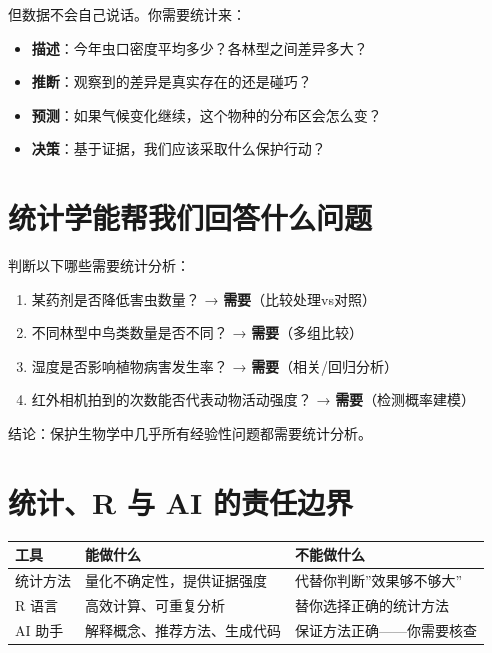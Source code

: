 \documentclass[
  letterpaper,
]{scrbook}
\newcounter{none} %
\providecommand{\tightlist}{%
  \setlength{\itemsep}{0pt}\setlength{\parskip}{0pt}}
\begin{document}
但数据不会自己说话。你需要统计来：

\begin{itemize}
\tightlist
\item
  \textbf{描述}：今年虫口密度平均多少？各林型之间差异多大？
\item
  \textbf{推断}：观察到的差异是真实存在的还是碰巧？
\item
  \textbf{预测}：如果气候变化继续，这个物种的分布区会怎么变？
\item
  \textbf{决策}：基于证据，我们应该采取什么保护行动？
\end{itemize}

\section{统计学能帮我们回答什么问题}\label{ux7edfux8ba1ux5b66ux80fdux5e2eux6211ux4eecux56deux7b54ux4ec0ux4e48ux95eeux9898}

判断以下哪些需要统计分析：

\begin{enumerate}
\def\labelenumi{\arabic{enumi}.}
\tightlist
\item
  某药剂是否降低害虫数量？ → \textbf{需要}（比较处理vs对照）
\item
  不同林型中鸟类数量是否不同？ → \textbf{需要}（多组比较）
\item
  湿度是否影响植物病害发生率？ → \textbf{需要}（相关/回归分析）
\item
  红外相机拍到的次数能否代表动物活动强度？ →
  \textbf{需要}（检测概率建模）
\end{enumerate}

结论：保护生物学中几乎所有经验性问题都需要统计分析。

\section{统计、R 与 AI
的责任边界}\label{ux7edfux8ba1r-ux4e0e-ai-ux7684ux8d23ux4efbux8fb9ux754c}

{\def\LTcaptype{none} %
\begin{longtable}[]{@{}lll@{}}
\toprule\noalign{}
工具 & 能做什么 & 不能做什么 \\
\midrule\noalign{}
\endhead
\bottomrule\noalign{}
\endlastfoot
统计方法 & 量化不确定性，提供证据强度 & 代替你判断''效果够不够大'' \\
R 语言 & 高效计算、可重复分析 & 替你选择正确的统计方法 \\
AI 助手 & 解释概念、推荐方法、生成代码 & 保证方法正确------你需要核查 \\
\end{longtable}
}
\end{document}
